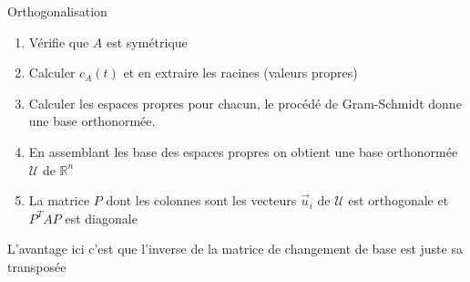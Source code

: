 \begin{parag}{Orthogonalisation}
\begin{truc}
\begin{itemize}
        \end{itemize}
    \end{truc}
\begin{enumerate}
    \item Vérifie que $A$ est symétrique
    \item Calculer $c_A(t)$ et en extraire les racines (valeurs propres)
    \item Calculer les espaces propres pour chacun, le procédé de Gram-Schmidt donne une base orthonormée.
    \item En assemblant les base des espaces propres on obtient une base orthonormée $\mathcal{U}$ de $\mathbb{R}^n$
    \item La matrice $P$ dont les colonnes sont les vecteurs $\vec{u}_i$ de $\mathcal{U}$ est orthogonale et $P^TAP$ est diagonale
\end{enumerate}   
\begin{framedremark}
    L'avantage ici c'est que l'inverse de la matrice de changement de base est juste sa transposée
\end{framedremark}
\end{parag}


